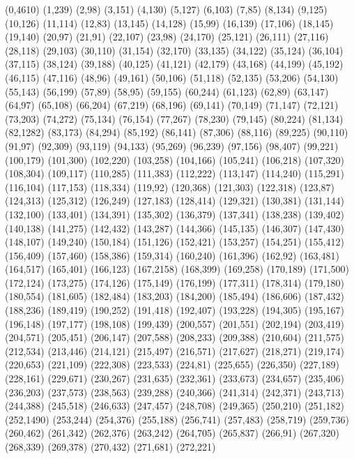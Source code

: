(0,4610)
(1,239)
(2,98)
(3,151)
(4,130)
(5,127)
(6,103)
(7,85)
(8,134)
(9,125)
(10,126)
(11,114)
(12,83)
(13,145)
(14,128)
(15,99)
(16,139)
(17,106)
(18,145)
(19,140)
(20,97)
(21,91)
(22,107)
(23,98)
(24,170)
(25,121)
(26,111)
(27,116)
(28,118)
(29,103)
(30,110)
(31,154)
(32,170)
(33,135)
(34,122)
(35,124)
(36,104)
(37,115)
(38,124)
(39,188)
(40,125)
(41,121)
(42,179)
(43,168)
(44,199)
(45,192)
(46,115)
(47,116)
(48,96)
(49,161)
(50,106)
(51,118)
(52,135)
(53,206)
(54,130)
(55,143)
(56,199)
(57,89)
(58,95)
(59,155)
(60,244)
(61,123)
(62,89)
(63,147)
(64,97)
(65,108)
(66,204)
(67,219)
(68,196)
(69,141)
(70,149)
(71,147)
(72,121)
(73,203)
(74,272)
(75,134)
(76,154)
(77,267)
(78,230)
(79,145)
(80,224)
(81,134)
(82,1282)
(83,173)
(84,294)
(85,192)
(86,141)
(87,306)
(88,116)
(89,225)
(90,110)
(91,97)
(92,309)
(93,119)
(94,133)
(95,269)
(96,239)
(97,156)
(98,407)
(99,221)
(100,179)
(101,300)
(102,220)
(103,258)
(104,166)
(105,241)
(106,218)
(107,320)
(108,304)
(109,117)
(110,285)
(111,383)
(112,222)
(113,147)
(114,240)
(115,291)
(116,104)
(117,153)
(118,334)
(119,92)
(120,368)
(121,303)
(122,318)
(123,87)
(124,313)
(125,312)
(126,249)
(127,183)
(128,414)
(129,321)
(130,381)
(131,144)
(132,100)
(133,401)
(134,391)
(135,302)
(136,379)
(137,341)
(138,238)
(139,402)
(140,138)
(141,275)
(142,432)
(143,287)
(144,366)
(145,135)
(146,307)
(147,430)
(148,107)
(149,240)
(150,184)
(151,126)
(152,421)
(153,257)
(154,251)
(155,412)
(156,409)
(157,460)
(158,386)
(159,314)
(160,240)
(161,396)
(162,92)
(163,481)
(164,517)
(165,401)
(166,123)
(167,2158)
(168,399)
(169,258)
(170,189)
(171,500)
(172,124)
(173,275)
(174,126)
(175,149)
(176,199)
(177,311)
(178,314)
(179,180)
(180,554)
(181,605)
(182,484)
(183,203)
(184,200)
(185,494)
(186,606)
(187,432)
(188,236)
(189,419)
(190,252)
(191,418)
(192,407)
(193,228)
(194,305)
(195,167)
(196,148)
(197,177)
(198,108)
(199,439)
(200,557)
(201,551)
(202,194)
(203,419)
(204,571)
(205,451)
(206,147)
(207,588)
(208,233)
(209,388)
(210,604)
(211,575)
(212,534)
(213,446)
(214,121)
(215,497)
(216,571)
(217,627)
(218,271)
(219,174)
(220,653)
(221,109)
(222,308)
(223,533)
(224,81)
(225,655)
(226,350)
(227,189)
(228,161)
(229,671)
(230,267)
(231,635)
(232,361)
(233,673)
(234,657)
(235,406)
(236,203)
(237,573)
(238,563)
(239,288)
(240,366)
(241,314)
(242,371)
(243,713)
(244,388)
(245,518)
(246,633)
(247,457)
(248,708)
(249,365)
(250,210)
(251,182)
(252,1490)
(253,244)
(254,376)
(255,188)
(256,741)
(257,483)
(258,719)
(259,736)
(260,462)
(261,342)
(262,376)
(263,242)
(264,705)
(265,837)
(266,91)
(267,320)
(268,339)
(269,378)
(270,432)
(271,681)
(272,221)
